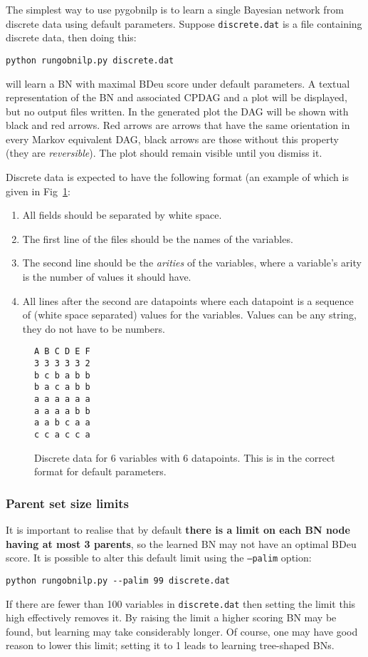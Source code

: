 \documentclass{article}
\newcommand{\pygobnilp}{\textsf{pygobnilp}}
\begin{document}
The simplest way to use \pygobnilp{} is to learn a single Bayesian
network from discrete data using default parameters. Suppose
\texttt{discrete.dat} is a file containing discrete data, then doing this:
\begin{verbatim}
python rungobnilp.py discrete.dat 
\end{verbatim}
will learn a BN with maximal BDeu score under default parameters. A
textual representation of the BN and associated CPDAG and a plot will
be displayed, but no output files written. In the generated plot the
DAG will be shown with black and red arrows. Red arrows are arrows
that have the same orientation in every Markov equivalent DAG, black
arrows are those without this property (they are
\emph{reversible}). The plot should remain visible until you dismiss
it.

Discrete data is expected to have the following format (an example of
which is given in Fig~\ref{fig:discretedat}:
\begin{enumerate}
\item All fields should be separated by white space.
\item The first line of the files should be the names of the
  variables.
\item The second line should be the \emph{arities} of the variables,
  where a variable's arity is the number of values it should have.
\item All lines after the second are datapoints where each datapoint
  is a sequence of (white space separated) values for the
  variables. Values can be any string, they do not have to be numbers.
\end{enumerate}

\begin{figure}
  \centering
\begin{verbatim}
A B C D E F
3 3 3 3 3 2
b c b a b b
b a c a b b
a a a a a a
a a a a b b
a a b c a a
c c a c c a
\end{verbatim}
  \caption{Discrete data for 6 variables with 6 datapoints. This is in
  the correct format for default parameters.}
  \label{fig:discretedat}
\end{figure}

\subsubsection{Parent set size limits}
\label{sec:palim}



It is important to realise that by default \textbf{there is a limit on
each BN node having at most 3 parents}, so the learned BN may not have
an optimal BDeu score. It is possible to alter this default limit
using the \texttt{--palim} option:
\begin{verbatim}
python rungobnilp.py --palim 99 discrete.dat 
\end{verbatim}
If there are fewer than 100 variables in \texttt{discrete.dat} then
setting the limit this high effectively removes it. By raising the
limit a higher scoring BN may be found, but learning may take
considerably longer. Of course, one may have good reason to lower this
limit; setting it to 1 leads to learning tree-shaped BNs.
\end{document}
